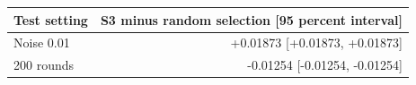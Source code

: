 \begin{tabular}{lr}
\toprule
Test setting & S3 minus random selection [95 percent interval] \\
\midrule
Noise 0.01 & +0.01873 [+0.01873, +0.01873] \\
200 rounds & -0.01254 [-0.01254, -0.01254] \\
\bottomrule
\end{tabular}
